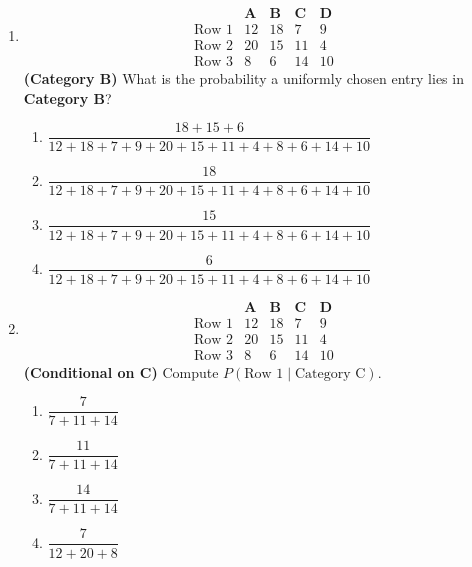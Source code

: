 
\begin{enumerate}[label=\textbf{S\arabic*.}]

\item
\[
\begin{array}{l|cccc}
    & \mathbf{A} & \mathbf{B} & \mathbf{C} & \mathbf{D} \\\hline
\text{Row 1} & 12 & 18 & 7 & 9 \\
\text{Row 2} & 20 & 15 & 11 & 4 \\
\text{Row 3} & 8  & 6  & 14 & 10
\end{array}
\]
\textbf{(Category B)} What is the probability a uniformly chosen entry lies in \textbf{Category B}?
\begin{enumerate}[label=(\Alph*)]
\item $\dfrac{18+15+6}{12+18+7+9+20+15+11+4+8+6+14+10}$
\item $\dfrac{18}{12+18+7+9+20+15+11+4+8+6+14+10}$
\item $\dfrac{15}{12+18+7+9+20+15+11+4+8+6+14+10}$
\item $\dfrac{6}{12+18+7+9+20+15+11+4+8+6+14+10}$
\end{enumerate}

\item
\[
\begin{array}{l|cccc}
    & \mathbf{A} & \mathbf{B} & \mathbf{C} & \mathbf{D} \\\hline
\text{Row 1} & 12 & 18 & 7 & 9 \\
\text{Row 2} & 20 & 15 & 11 & 4 \\
\text{Row 3} & 8  & 6  & 14 & 10
\end{array}
\]
\textbf{(Conditional on C)} Compute $P(\text{Row 1}\mid \text{Category C})$.
\begin{enumerate}[label=(\Alph*)]
\item $\dfrac{7}{7+11+14}$
\item $\dfrac{11}{7+11+14}$
\item $\dfrac{14}{7+11+14}$
\item $\dfrac{7}{12+20+8}$
\end{enumerate}


\end{enumerate}
